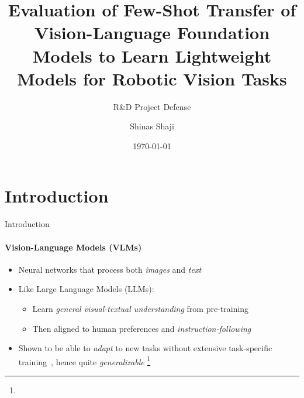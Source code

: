 \documentclass[aspectratio=169]{beamer}
\author[Shinas Shaji]{Shinas Shaji}
\title{Evaluation of Few-Shot Transfer of Vision-Language Foundation Models to Learn Lightweight Models for Robotic Vision Tasks}
\subtitle{R\&D Project Defense}
\institute[HBRS]{Hochschule Bonn-Rhein-Sieg}
\date{\today}
\newcommand\blfootnote[1]{%
  \begingroup
  \renewcommand\thefootnote{}\footnote{#1}%
  \addtocounter{footnote}{-1}%
  \endgroup
}
\begin{document}
{
\begin{frame}
\titlepage
\end{frame}
}


\section{Introduction}
\begin{frame}{Introduction}
\framesubtitle{Vision-Language Models (VLMs)}
  \begin{itemize}
    \item Neural networks that process both \emph{images} and \emph{text}
    \item Like Large Language Models (LLMs):
    \begin{itemize}
      \item Learn \emph{general visual-textual understanding} from pre-training~
      \item Then aligned to human preferences and \emph{instruction-following}
    \end{itemize}
    \item Shown to be able to \emph{adapt} to new tasks without extensive task-specific training~, hence quite \emph{generalizable}
    \blfootnote{\vspace{0.05em}}
  \end{itemize}
\end{frame}
\end{document}
